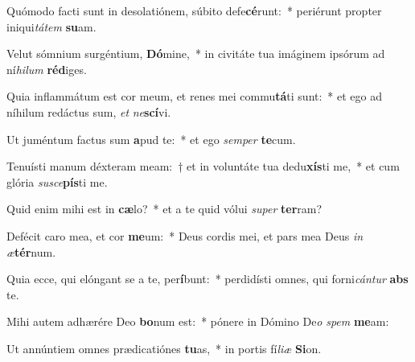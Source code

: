 \item Quómodo facti sunt in desolatiónem, súbito defe\textbf{cé}runt:~* periérunt propter iniqui\textit{tá}\textit{tem} \textbf{su}am.
\item Velut sómnium surgéntium, \textbf{Dó}mine,~* in civitáte tua imáginem ipsórum ad ní\textit{hi}\textit{lum} \textbf{réd}iges.
\item Quia inflammátum est cor meum, et renes mei commu\textbf{tá}ti sunt:~* et ego ad níhilum redáctus sum, \textit{et} \textit{ne}\textbf{scí}vi.
\item Ut juméntum factus sum \textbf{a}pud te:~* et ego \textit{sem}\textit{per} \textbf{te}cum.
\item Tenuísti manum déxteram meam:~† et in voluntáte tua dedu\textbf{xís}ti me,~* et cum glória \textit{su}\textit{sce}\textbf{pís}ti me.
\item Quid enim mihi est in \textbf{cæ}lo?~* et a te quid vólui \textit{su}\textit{per} \textbf{ter}ram?
\item Defécit caro mea, et cor \textbf{me}um:~* Deus cordis mei, et pars mea Deus \textit{in} \textit{æ}\textbf{tér}num.
\item Quia ecce, qui elóngant se a te, per\textbf{í}bunt:~* perdidísti omnes, qui forni\textit{cán}\textit{tur} \textbf{abs} te.
\item Mihi autem adhærére Deo \textbf{bo}num est:~* pónere in Dómino De\textit{o} \textit{spem} \textbf{me}am:
\item Ut annúntiem omnes prædicatiónes \textbf{tu}as,~* in portis fí\textit{li}\textit{æ} \textbf{Si}on.
